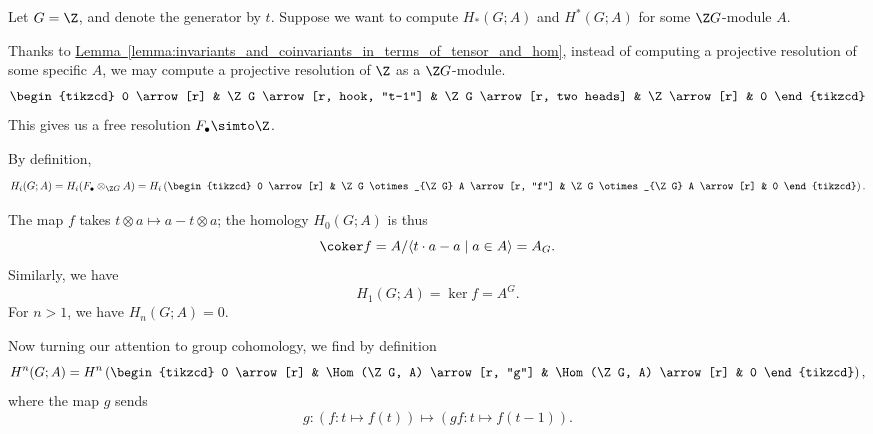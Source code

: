\documentclass[main.tex]{subfiles}
\begin{document}
\begin{example}
  Let $G = \Z$, and denote the generator by $t$. Suppose we want to compute $H_{*}(G; A)$ and $H^{*}(G; A)$ for some $\Z G$-module $A$.
  
  Thanks to \hyperref[lemma:invariants_and_coinvariants_in_terms_of_tensor_and_hom]{Lemma~\ref*{lemma:invariants_and_coinvariants_in_terms_of_tensor_and_hom}}, instead of computing a projective resolution of some specific $A$, we may compute a projective resolution of $\Z$ as a $\Z G$-module.
  \begin{equation*}
    \begin{tikzcd}
      0
      \arrow[r]
      & \Z G
      \arrow[r, hook, "t-1"]
      & \Z G
      \arrow[r, two heads]
      & \Z
      \arrow[r]
      & 0
    \end{tikzcd}
  \end{equation*}
  This gives us a free resolution $F_{\bullet} \simto \Z$.

  By definition,
  \begin{equation*}
    H_{i}(G; A) = H_{i}(F_{\bullet} \otimes_{\Z G} A) = H_{i}\left( 
    \begin{tikzcd}
      0
      \arrow[r]
      & \Z G \otimes_{\Z G} A
      \arrow[r, "f"]
      & \Z G \otimes_{\Z G} A
      \arrow[r]
      & 0
    \end{tikzcd}
    \right).
  \end{equation*}

  The map $f$ takes $t \otimes a \mapsto a - t \otimes a$; the homology $H_{0}(G; A)$ is thus
  \begin{equation*}
    \coker f = A/\langle t\cdot a - a \mid a \in A \rangle = A_{G}.
  \end{equation*}
  Similarly, we have
  \begin{equation*}
    H_{1}(G; A) = \ker f = A^{G}.
  \end{equation*}
  For $n > 1$, we have $H_{n}(G; A) = 0$.

  Now turning our attention to group cohomology, we find by definition
  \begin{equation*}
    H^{n}(G; A) = H^{n}\left(
    \begin{tikzcd}
      0
      \arrow[r]
      & \Hom(\Z G, A)
      \arrow[r, "g"]
      & \Hom(\Z G, A)
      \arrow[r]
      & 0
    \end{tikzcd}
    \right),
  \end{equation*}
  where the map $g$ sends
  \begin{equation*}
    g\colon \left( f\colon t \mapsto f(t) \right) \mapsto \left( gf\colon t \mapsto f(t-1) \right).
  \end{equation*}


\end{example}
\end{document}
